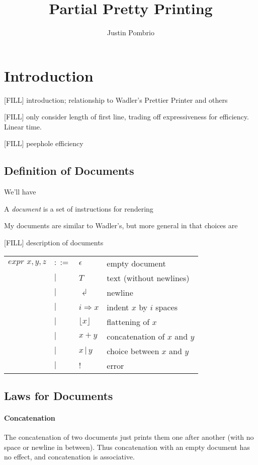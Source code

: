 \documentclass{article}
\makeatletter
\newenvironment{Table}
  {\begin{center}\begin{tabular}{l @{\;\;} l @{\;\;} l @{\quad\quad} l}}
  {\end{tabular}\end{center}}
\newcommand{\txt}{T}
\newcommand{\nil}{{\epsilon}}
\newcommand{\err}{{!}}
\newcommand{\nl}{{\dlsh}}
\newcommand{\ind}[2]{#1 \Rightarrow #2}
\renewcommand{\flat}[1]{\lfloor #1 \rfloor}
\newcommand{\cat}[2]{#1 + #2}
\newcommand{\choice}[2]{#1 \,|\, #2}
\makeatother
\begin{document}
\author{Justin Pombrio}
\title{Partial Pretty Printing}
\maketitle

\section{Introduction}

[FILL] introduction; relationship to Wadler's Prettier Printer and others

[FILL] only consider length of first line, trading off expressiveness for efficiency. Linear time.

[FILL] peephole efficiency

\subsection{Definition of Documents}

We'll have 

A \emph{document} is a set of instructions for rendering

My documents are similar to Wadler's, but more general in that choices are 

[FILL] description of documents

\begin{Table}
  $\textit{expr } x, y, z$
  &$::=$& $\nil$ & empty document \\
    &$|$& $\txt$ & text (without newlines) \\
    &$|$& $\nl$ & newline \\
    &$|$& $\ind{i}{x}$ & indent $x$ by $i$ spaces \\
    &$|$& $\flat{x}$ & flattening of $x$ \\
    &$|$& $\cat{x}{y}$ & concatenation of $x$ and $y$ \\
    &$|$& $\choice{x}{y}$ & choice between $x$ and $y$ \\
    &$|$& $\err$ & error
\end{Table}

\subsection{Laws for Documents}

\paragraph{Concatenation}
The concatenation of two documents just prints them one after another (with no space or newline in
between). Thus concatenation with an empty document has no effect, and concatenation is associative.
\end{document}
